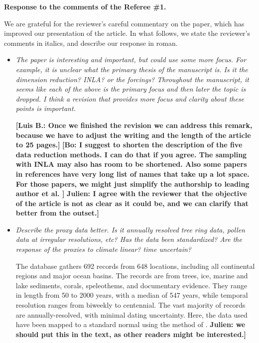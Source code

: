 \documentclass[11pt]{article}
\newcommand{\lb}[1]{\color{ForestGreen}\textbf{[Luis B.: #1]}\normalcolor}
\newcommand{\bl}[1]{\color{red}\textbf{[Bo: #1]}\normalcolor}
\newcommand{\jeg}[1]{\color{blue}\textbf{Julien: #1]}\normalcolor}
\begin{document}
\begin{center}
  {\Large \textbf{Response to the comments of the Referee \#1.}}
\end{center}

We are grateful for the reviewer's careful commentary on the paper, which has improved
our presentation of the article. In what follows, we state the reviewer's
comments in italics, and describe our response in roman.

\begin{itemize}
\item \textit{The paper is interesting and important, but could use some more
focus. For example, it is unclear what the primary thesis of the manuscript is.
Is it the dimension reduction? INLA? or the forcings? Throughout the manuscript,
it seems like each of the above is the primary focus and then later the topic is
dropped. I think a revision that provides more focus and clarity about these
points is important.
}

  \lb{Once we finished the revision we can address this remark, because we have
    to adjust the writing and the length of the article to 25 pages.}
  \bl{I suggest to shorten the description of the five data reduction methods. I can do that if you agree. The sampling with INLA may also has room to be shortened. Also some papers in references have very long list of names that take up a lot space. For those papers, we might just simplify the authorship to leading author et al. }
  \jeg{I agree with the reviewer that the objective of the article is not as clear as it could be, and we can clarify that better from the outset.}
  
\item \textit{Describe the proxy data better. Is it annually resolved tree ring
    data, pollen data at irregular resolutions, etc? Has the data been
    standardized? Are the response of the proxies to climate linear? time
    uncertain?}

  The database gathers 692 records from 648 locations, including all continental regions and major ocean basins. The records are from trees, ice, marine and lake sediments, corals, speleothems, and documentary evidence. They range in length from 50 to 2000 years, with a median of 547 years, while temporal resolution ranges from biweekly to centennial.
  The vast majority of records are annually-resolved, with minimal dating
  uncertainty. Here, the data used have been mapped to a standard normal using
  the method of \cite{vanAlbada2007}. \jeg{we should put this in the text, as
    other readers might be interested.}
  

\end{itemize}
\end{document}
